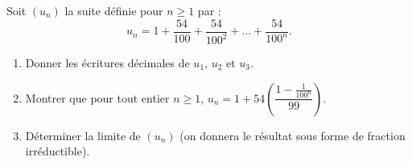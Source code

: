 \documentclass[a4paper,11pt,DIV12,BCOR0mm]{scrartcl}
\begin{document}
\begin{exercice}
 Soit $(u_n)$ la suite définie pour $n\geq 1$ par :
\[
 u_n = 1 + \frac{54}{100} + \frac{54}{100^2} + \dots + \frac{54}{100^n}.
\]
\begin{enumerate}
 \item Donner les écritures décimales de $u_1$, $u_2$ et $u_3$.
 \item Montrer que pour tout entier $n\geq1$, $u_n=1+54\left(\dfrac{1-\frac{1}{100^n}}{99}\right).$
 \item Déterminer la limite de $(u_n)$ (on donnera le résultat sous forme de fraction irréductible).
\end{enumerate}

\end{exercice}
\end{document}
